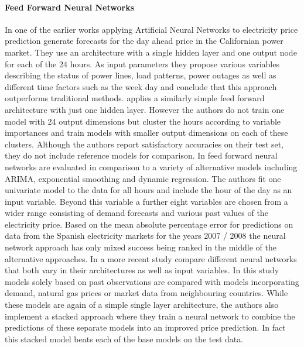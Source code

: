 \paragraph{Feed Forward Neural Networks}
In one of the earlier works applying Artificial Neural Networks to electricity price prediction \cite{yamin_adaptive_2004} generate forecasts for the day ahead price in the Californian power market. They use an architecture with a single hidden layer and one output node for each of the 24 hours. As input parameters they propose various variables describing the status of power lines, load patterns, power outages as well as different time factors such as the week day and conclude that this approach outperforms traditional methods. 
\cite{gareta_forecasting_2006} applies a similarly simple feed forward architecture with just one hidden layer. However the authors do not train one model with 24 output dimensions but cluster the hours according to variable importances and train models with smaller output dimensions on each of these clusters. Although the authors report satisfactory accuracies on their test set, they do not include reference models for comparison. In \cite{cruz_effect_2011} feed forward neural networks are evaluated in comparison to a variety of alternative models including ARIMA, exponential smoothing and dynamic regression. The authors fit one univariate model to the data for all hours and include the hour of the day as an input variable. Beyond this variable a further eight variables are chosen from a wider range consisting of demand forecasts and various past values of the electricity price. Based on the mean absolute percentage error for predictions on data from the Spanish electricity markets for the years 2007 / 2008 the neural network approach has only mixed success being ranked in the middle of the alternative approaches. In a more recent study \cite{panapakidis_day-ahead_2016} compare different neural networks that both vary in their architectures as well as input variables. In this study models solely based on past observations are compared with models incorporating demand, natural gas prices or market data from neighbouring countries. While these models are again of a simple single layer architecture, the authors also implement a stacked approach where they train a neural network to combine the predictions of these separate models into an improved price prediction. In fact this stacked model beats each of the base models on the test data. 


